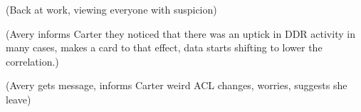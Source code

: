 (Back at work, viewing everyone with suspicion)

(Avery informs Carter they noticed that there was an uptick in DDR activity in many cases, makes a card to that effect, data starts shifting to lower the correlation.)

(Avery gets message, informs Carter weird ACL changes, worries, suggests she leave)
